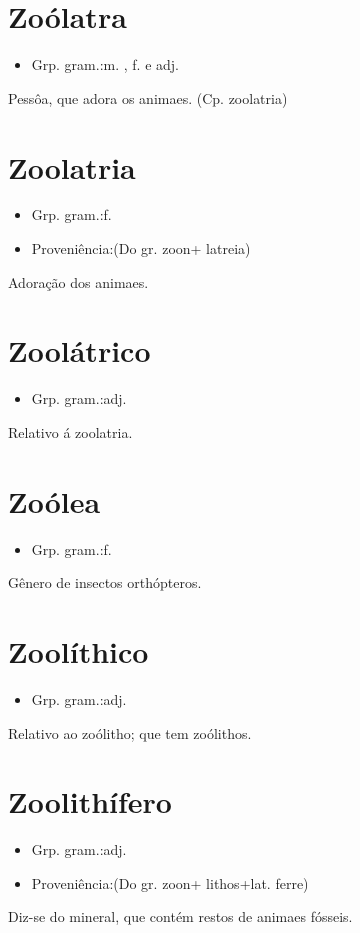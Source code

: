 \section{Zoólatra}
\begin{itemize}
\item {Grp. gram.:m. ,  f.  e  adj.}
\end{itemize}
Pessôa, que adora os animaes.
(Cp. \textunderscore zoolatria\textunderscore )
\section{Zoolatria}
\begin{itemize}
\item {Grp. gram.:f.}
\end{itemize}
\begin{itemize}
\item {Proveniência:(Do gr. \textunderscore zoon\textunderscore  + \textunderscore latreia\textunderscore )}
\end{itemize}
Adoração dos animaes.
\section{Zoolátrico}
\begin{itemize}
\item {Grp. gram.:adj.}
\end{itemize}
Relativo á zoolatria.
\section{Zoólea}
\begin{itemize}
\item {Grp. gram.:f.}
\end{itemize}
Gênero de insectos orthópteros.
\section{Zoolíthico}
\begin{itemize}
\item {Grp. gram.:adj.}
\end{itemize}
Relativo ao zoólitho; que tem zoólithos.
\section{Zoolithífero}
\begin{itemize}
\item {Grp. gram.:adj.}
\end{itemize}
\begin{itemize}
\item {Proveniência:(Do gr. \textunderscore zoon\textunderscore  + \textunderscore lithos\textunderscore  +lat. \textunderscore ferre\textunderscore )}
\end{itemize}
Diz-se do mineral, que contém restos de animaes fósseis.
